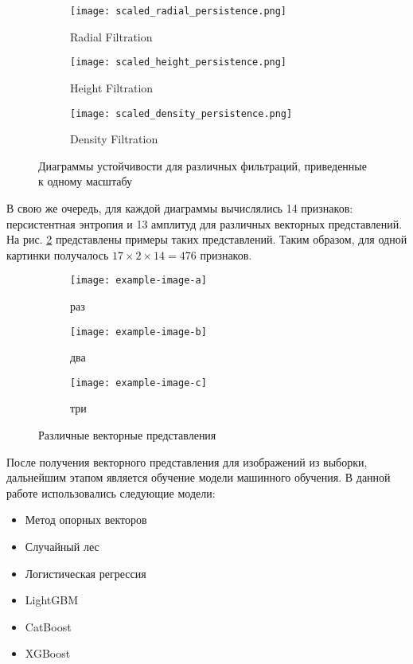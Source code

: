\begin{figure}[!htbp]
	\begin{subfigure}{.33\textwidth}
		\centering
		\texttt{[image: scaled\_radial\_persistence.png]}\\
		\caption{Radial Filtration}
	\end{subfigure}%
	\begin{subfigure}{.33\textwidth}
		\centering
		\texttt{[image: scaled\_height\_persistence.png]}\\
		\caption{Height Filtration}
	\end{subfigure}%
	\begin{subfigure}{.33\textwidth}
		\centering
		\texttt{[image: scaled\_density\_persistence.png]}\\
		\caption{Density Filtration}
	\end{subfigure}%
	\caption{Диаграммы устойчивости для различных фильтраций, приведенные к одному масштабу}
	\label{scaled_persistences}
\end{figure}

В свою же очередь, для каждой диаграммы вычислялись 14 признаков: персистентная энтропия и 13 амплитуд для различных векторных представлений. На рис. \ref{representations} представлены примеры таких представлений. Таким образом, для одной картинки получалось $17 \times 2 \times 14 = 476$ признаков.

\begin{figure}[!htbp]
	\begin{subfigure}{.33\textwidth}
		\centering
		\texttt{[image: example-image-a]}\\
		\caption{раз}
	\end{subfigure}%
	\begin{subfigure}{.33\textwidth}
		\centering
		\texttt{[image: example-image-b]}\\
		\caption{два}
	\end{subfigure}%
	\begin{subfigure}{.33\textwidth}
		\centering
		\texttt{[image: example-image-c]}\\
		\caption{три}
	\end{subfigure}%
	\caption{Различные векторные представления}
	\label{representations}
\end{figure}

После получения векторного представления для изображений из выборки, дальнейшим этапом является обучение модели машинного обучения. В данной работе использовались следующие модели:
\begin{itemize}
	\item Метод опорных векторов
	\item Случайный лес
	\item Логистическая регрессия
	\item LightGBM
	\item CatBoost
	\item XGBoost
\end{itemize}
